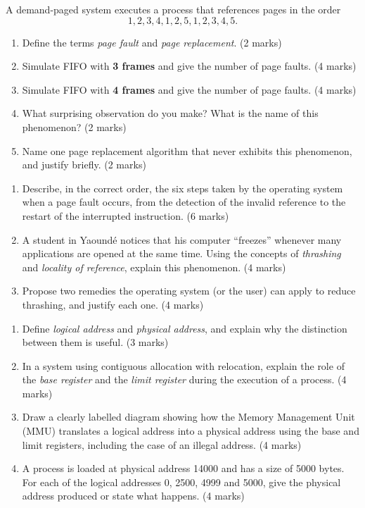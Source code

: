 \documentclass[11pt]{article}
\begin{document}
\begin{exercice}
A demand-paged system executes a process that references pages in the order
\[1, 2, 3, 4, 1, 2, 5, 1, 2, 3, 4, 5.\]
\begin{enumerate}
\item Define the terms \emph{page fault} and \emph{page replacement}. \hfill (2 marks)
\item Simulate FIFO with \textbf{3 frames} and give the number of page faults. \hfill (4 marks)
\item Simulate FIFO with \textbf{4 frames} and give the number of page faults. \hfill (4 marks)
\item What surprising observation do you make? What is the name of this phenomenon? \hfill (2 marks)
\item Name one page replacement algorithm that never exhibits this phenomenon, and justify briefly. \hfill (2 marks)
\end{enumerate}
\end{exercice}

\begin{exercice}
\begin{enumerate}
\item Describe, in the correct order, the six steps taken by the operating system when a page fault occurs, from the detection of the invalid reference to the restart of the interrupted instruction. \hfill (6 marks)
\item A student in Yaoundé notices that his computer ``freezes'' whenever many applications are opened at the same time. Using the concepts of \emph{thrashing} and \emph{locality of reference}, explain this phenomenon. \hfill (4 marks)
\item Propose two remedies the operating system (or the user) can apply to reduce thrashing, and justify each one. \hfill (4 marks)
\end{enumerate}
\end{exercice}

\begin{exercice}
\begin{enumerate}
\item Define \emph{logical address} and \emph{physical address}, and explain why the distinction between them is useful. \hfill (3 marks)
\item In a system using contiguous allocation with relocation, explain the role of the \emph{base register} and the \emph{limit register} during the execution of a process. \hfill (4 marks)
\item Draw a clearly labelled diagram showing how the Memory Management Unit (MMU) translates a logical address into a physical address using the base and limit registers, including the case of an illegal address. \hfill (4 marks)
\item A process is loaded at physical address 14000 and has a size of 5000 bytes. For each of the logical addresses 0, 2500, 4999 and 5000, give the physical address produced or state what happens. \hfill (4 marks)
\end{enumerate}
\end{exercice}
\end{document}
